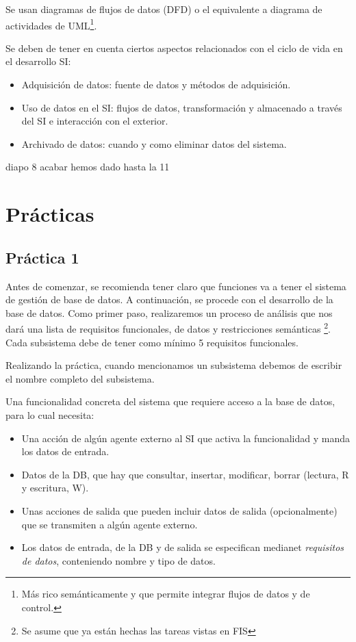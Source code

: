 \documentclass[12pt]{report} %
\providecommand{\tightlist}{%
  \setlength{\itemsep}{0pt}\setlength{\parskip}{0pt}}
\begin{document}
Se usan diagramas de flujos de datos (DFD) o el equivalente a diagrama
de actividades de
UML\footnote{Más rico semánticamente y que permite integrar flujos de datos y de control.}.

Se deben de tener en cuenta ciertos aspectos relacionados con el ciclo
de vida en el desarrollo SI:

\begin{itemize}
\tightlist
\item
  Adquisición de datos: fuente de datos y métodos de adquisición.
\item
  Uso de datos en el SI: flujos de datos, transformación y almacenado a
  través del SI e interacción con el exterior.
\item
  Archivado de datos: cuando y como eliminar datos del sistema.
\end{itemize}

diapo 8 acabar hemos dado hasta la 11

\part{Prácticas}

\hypertarget{pruxe1ctica-1}{%
\chapter{Práctica 1}\label{pruxe1ctica-1}}

Antes de comenzar, se recomienda tener claro que funciones va a tener el
sistema de gestión de base de datos. A continuación, se procede con el
desarrollo de la base de datos. Como primer paso, realizaremos un
proceso de análisis que nos dará una lista de requisitos funcionales, de
datos y restricciones semánticas
\footnote{Se asume que ya están hechas las tareas vistas en FIS}. Cada
subsistema debe de tener como mínimo 5 requisitos funcionales.

Realizando la práctica, cuando mencionamos un subsistema debemos de
escribir el nombre completo del subsistema.

\begin{definicion}

    Una funcionalidad concreta del sistema que requiere acceso a la base de datos, para lo cual necesita:

    \begin{itemize}

    \item Una acción de algún agente externo al SI que activa la funcionalidad y manda los datos de entrada.
    \item Datos de la DB, que hay que consultar, insertar, modificar, borrar (lectura, R y escritura, W).
    \item Unas acciones de salida que pueden incluir datos de salida (opcionalmente) que se transmiten a algún agente externo.
    \item Los datos de entrada, de la DB y de salida se especifican medianet \textit{requisitos de datos}, conteniendo nombre y tipo de datos.

    \end{itemize}

\end{definicion}
\end{document}
